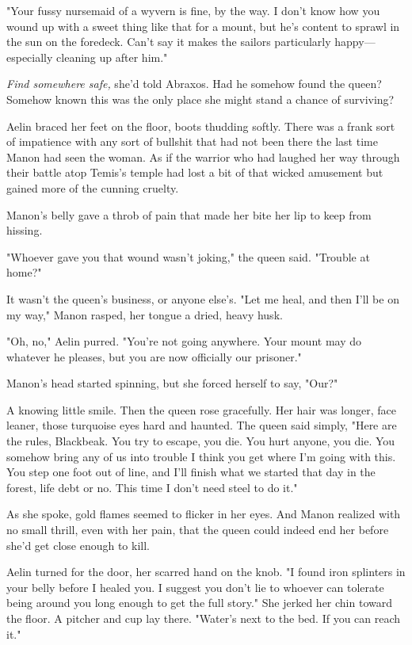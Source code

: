 "Your fussy nursemaid of a wyvern is fine, by the way. I don't know how you wound up with a sweet thing like that for a mount, but he's content to sprawl in the sun on the foredeck. Can't say it makes the sailors particularly happy--- especially cleaning up after him."

\emph{Find somewhere safe,} she'd told Abraxos. Had he somehow found the queen? Somehow known this was the only place she might stand a chance of surviving?

Aelin braced her feet on the floor, boots thudding softly. There was a frank sort of impatience with any sort of bullshit that had not been there the last time Manon had seen the woman. As if the warrior who had laughed her way through their battle atop Temis's temple had lost a bit of that wicked amusement but gained more of the cunning cruelty.

Manon's belly gave a throb of pain that made her bite her lip to keep from hissing.

"Whoever gave you that wound wasn't joking," the queen said. "Trouble at home?"

It wasn't the queen's business, or anyone else's. "Let me heal, and then I'll be on my way," Manon rasped, her tongue a dried, heavy husk.

"Oh, no," Aelin purred. "You're not going anywhere. Your mount may do whatever he pleases, but you are now officially our prisoner."

Manon's head started spinning, but she forced herself to say, "Our?"

A knowing little smile. Then the queen rose gracefully. Her hair was longer, face leaner, those turquoise eyes hard and haunted. The queen said simply, "Here are the rules, Blackbeak. You try to escape, you die. You hurt anyone, you die. You somehow bring any of us into trouble
 I think you get where I'm going with this. You step one foot out of line, and I'll finish what we started that day in the forest, life debt or no. This time I don't need steel to do it."

As she spoke, gold flames seemed to flicker in her eyes. And Manon realized with no small thrill, even with her pain, that the queen could indeed end her before she'd get close enough to kill.

Aelin turned for the door, her scarred hand on the knob. "I found iron splinters in your belly before I healed you. I suggest you don't lie to whoever can tolerate being around you long enough to get the full story." She jerked her chin toward the floor. A pitcher and cup lay there. "Water's next to the bed. If you can reach it."

